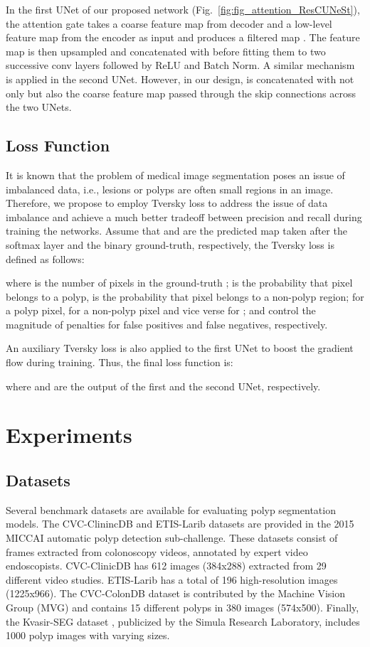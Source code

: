 \documentclass[review, sort&compress]{elsarticle}
\begin{document}
In the first UNet of our proposed network (Fig.~\ref{fig:fig_attention_ResCUNeSt}), the attention gate takes a coarse feature map  from decoder and a low-level feature map  from the encoder as input and produces a filtered map . The feature map  is then upsampled and concatenated with  before fitting them to two successive   conv layers followed by ReLU and Batch Norm. A similar mechanism is applied in the second UNet. However, in our design,  is concatenated with not only  but also the coarse feature map  passed through the skip connections across the two UNets.

\subsection{Loss Function}
It is known that the problem of medical image segmentation poses an issue of imbalanced data, i.e., lesions or polyps are often small regions in an image. Therefore, we propose to employ  Tversky loss \cite{salehi2017tversky} to address the issue of data imbalance and achieve a much better tradeoff between precision and recall during training the networks. Assume that  and  are the predicted map taken after the softmax layer and the binary ground-truth, respectively, the Tversky loss is defined as follows:

where  is the number of pixels in the ground-truth ;  is the probability that pixel  belongs to a polyp,  is the probability that pixel  belongs to a non-polyp region;  for a polyp pixel,  for a non-polyp pixel and vice verse for ;  and  control the magnitude of penalties for false positives and false negatives, respectively.

An auxiliary Tversky loss is also applied to the first UNet to boost the gradient flow during training. Thus, the final loss function is:

where  and  are the output of the first and the second UNet, respectively.

\section{Experiments}
\label{sec:experiments}

\subsection{Datasets}
Several benchmark datasets are available for evaluating polyp segmentation models. The CVC-ClinincDB \cite{bernal2015wm} and ETIS-Larib \cite{silva2014toward} datasets are provided in the 2015 MICCAI automatic polyp detection sub-challenge. These datasets consist of frames extracted from colonoscopy videos, annotated by expert video endoscopists. CVC-ClinicDB has 612 images (384x288) extracted from 29 different video studies. ETIS-Larib has a total of 196 high-resolution images (1225x966). The CVC-ColonDB \cite{bernal2012towards} dataset is contributed by the Machine Vision Group (MVG) and contains 15 different polyps in 380 images (574x500). Finally, the Kvasir-SEG dataset \cite{jha2020kvasir}, publicized by the Simula Research Laboratory, includes 1000 polyp images with varying sizes.
\end{document}
